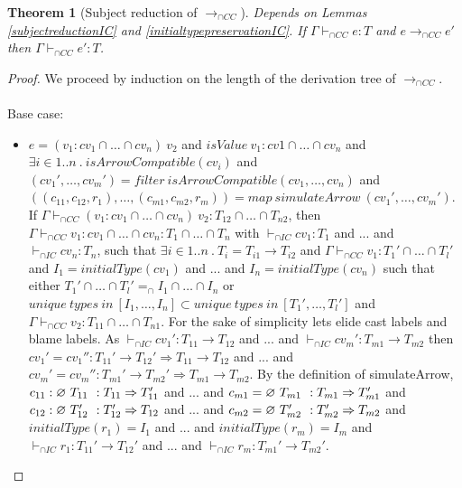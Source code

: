 \documentclass[a4paper]{article}
\newtheorem{theorem}{Theorem}
\begin{document}
\begin{theorem}[Subject reduction of $\longrightarrow_{\cap CC}$]
\label{subjectreduction}
Depends on Lemmas \ref{subjectreductionIC} and \ref{initialtypepreservationIC}.
If $\Gamma \vdash_{\cap CC} e : T$ and $e \longrightarrow_{\cap CC} e'$ then $\Gamma \vdash_{\cap CC} e' : T$.
\end{theorem}
\begin{proof}
We proceed by induction on the length of the derivation tree of $\longrightarrow_{\cap CC}$.\\\\
Base case:
\begin{itemize}
    \item $e = (v_1 : cv_1 \cap \ldots \cap cv_n)\ v_2$ and $isValue\ v_1 : cv1 \cap \ldots \cap cv_n$ and $\exists i \in 1 .. n\ .\ isArrowCompatible(cv_i)$ and $(cv_1', \ldots, cv_m') = filter\ isArrowCompatible (cv_1, \ldots, cv_n)$ and $((c_{11}, c_{12}, r_1), \ldots, (c_{m1}, c_{m2}, r_m)) = map\ simulateArrow\ (cv_1', \ldots, cv_m')$.
    If $\Gamma \vdash_{\cap CC} (v_1 : cv_1 \cap \ldots \cap cv_n)\ v_2 : T_{12} \cap \ldots \cap T_{n2}$, then $\Gamma \vdash_{\cap CC} v_1 : cv_1 \cap \ldots \cap cv_n : T_1 \cap \ldots \cap T_n$ with $\vdash_{\cap IC} cv_1 : T_1$ and ... and $\vdash_{\cap IC} cv_n : T_n$, such that $\exists i \in 1 .. n\ .\ T_i = T_{i1} \rightarrow T_{i2}$ and $\Gamma \vdash_{\cap CC} v_1 : T_1' \cap \ldots \cap T_l'$ and $I_1 = initialType(cv_1)$ and ... and $I_n = initialType(cv_n)$ such that either $T_1' \cap \ldots \cap T_l' =_{\cap} I_1 \cap \ldots \cap I_n$ or $unique\ types\ in\ [I_1, \ldots, I_n] \subset unique\ types\ in\ [T_1', \ldots, T_l']$ and $\Gamma \vdash_{\cap CC} v_2 : T_{11} \cap \ldots \cap T_{n1}$.
    For the sake of simplicity lets elide cast labels and blame labels.
    As $\vdash_{\cap IC} cv_1' : T_{11} \rightarrow T_{12}$ and ... and $\vdash_{\cap IC} cv_m' : T_{m1} \rightarrow T_{m2}$ then $cv_1' = cv_1'' : T_{11}' \rightarrow T_{12}' \Rightarrow T_{11} \rightarrow T_{12}$ and ... and $cv_m' = cv_m'' : T_{m1}' \rightarrow T_{m2}' \Rightarrow T_{m1} \rightarrow T_{m2}$.
    By the definition of simulateArrow, $c_{11} : \varnothing\ T_{11}\ ^{} : T_{11} \Rightarrow T_{11}'$ and ... and $c_{m1} = \varnothing\ T_{m1}\ ^{} : T_{m1} \Rightarrow T_{m1}'$ and $c_{12} : \varnothing\ T_{12}'\ ^{} : T_{12}' \Rightarrow T_{12}$ and ... and $c_{m2} = \varnothing\ T_{m2}'\ ^{} : T_{m2}' \Rightarrow T_{m2}$ and $initialType(r_1) = I_1$ and ... and $initialType(r_m) = I_m$ and $\vdash_{\cap IC} r_1 : T_{11}' \rightarrow T_{12}'$ and ... and $\vdash_{\cap IC} r_m : T_{m1}' \rightarrow T_{m2}'$.

\end{itemize}
\end{proof}
\end{document}

